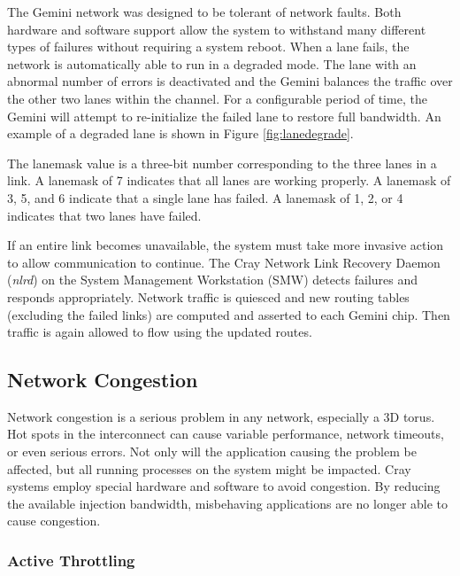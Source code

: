 \documentclass[10pt, conference, compsocconf]{IEEEtran}
\begin{document}
The Gemini network was designed to be tolerant of network faults.  Both
hardware and software support allow the system to withstand many different
types of failures without requiring a system reboot.  When a lane fails, the
network is automatically able to run in a degraded mode.  The lane with an
abnormal number of errors is deactivated and the Gemini balances the traffic
over the other two lanes within the channel.  For a configurable period of
time, the Gemini will attempt to re-initialize the failed lane to restore full
bandwidth.  An example of a degraded lane is shown in Figure
\ref{fig:lanedegrade}. 


The lanemask value is a three-bit number corresponding to the three lanes in a
link.  A lanemask of 7 indicates that all lanes are working properly.  A
lanemask of 3, 5, and 6 indicate that a single lane has failed.  A lanemask of
1, 2, or 4 indicates that two lanes have failed.

If an entire link becomes unavailable, the system must take more invasive
action to allow communication to continue.  The Cray Network Link Recovery
Daemon (\emph{nlrd}) on the System Management Workstation (SMW) detects failures and
responds appropriately.  Network traffic is quiesced and new routing tables
(excluding the failed links) are computed and asserted to each Gemini chip.
Then traffic is again allowed to flow using the updated routes.

\subsection{Network Congestion}

Network congestion is a serious problem in any network, especially a 3D torus.
Hot spots in the interconnect can cause variable performance, network timeouts,
or even serious errors.  Not only will the application causing the problem be
affected, but all running processes on the system might be impacted.  Cray
systems employ special hardware and software to avoid congestion.  By reducing
the available injection bandwidth, misbehaving applications are no longer able
to cause congestion.

\subsubsection{Active Throttling}
\end{document}
